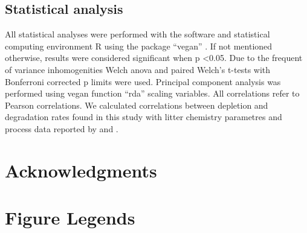 \documentclass[10pt]{article}
\begin{document}
\subsection*{Statistical analysis}
All statistical analyses were performed with the software and statistical computing environment R using the package ``vegan'' \cite{Oksanen2011}. If not mentioned otherwise, results were considered significant when p \textless 0.05. Due to the frequent of variance inhomogenities Welch anova and paired Welch's t-tests with Bonferroni corrected p limits were used. Principal component analysis was performed using vegan function ``rda'' scaling variables. All correlations refer to Pearson correlations. We calculated correlations between depletion and degradation rates found in this study with litter chemistry parametres and process data reported by \cite{Mooshammer2011} and \cite{Leitner2011}.

\section*{Acknowledgments}




\section*{Figure Legends}
\end{document}
